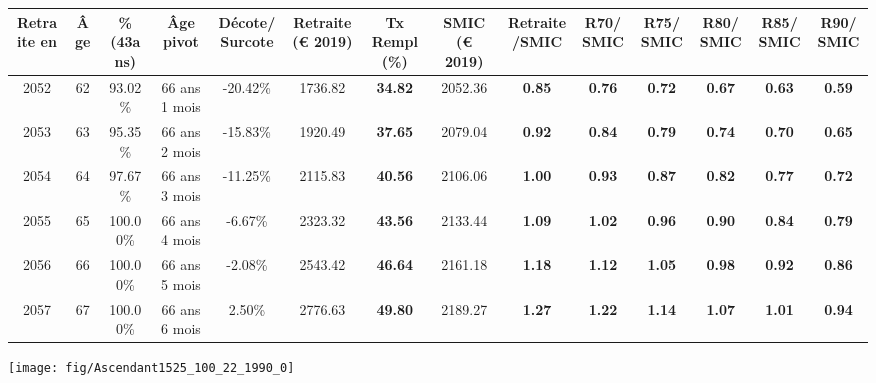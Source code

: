 \begin{adjustbox}{max width=\textwidth} 
\begin{tabular}[htb]{|c|c||c|c|c||c|c||c|c||c|c|c|c|c|} 
\hline 
 Retraite en &  Âge &  \%(43ans) &  Âge pivot &  Décote/Surcote &  Retraite (\euro{} 2019) &  Tx Rempl(\%) &  SMIC (\euro{} 2019) &  Retraite/SMIC &  R70/SMIC &  R75/SMIC &  R80/SMIC &  R85/SMIC &  R90/SMIC \\ 
\hline \hline 
 2052 &  62 &  93.02\% &  66 ans 1 mois &  -20.42\% &  1736.82 &  {\bf 34.82} &  2052.36 &  {\bf {\color{red} 0.85}} &  {\bf {\color{red} 0.76}} &  {\bf {\color{red} 0.72}} &  {\bf {\color{red} 0.67}} &  {\bf {\color{red} 0.63}} &  {\bf {\color{red} 0.59}} \\ 
\hline 
 2053 &  63 &  95.35\% &  66 ans 2 mois &  -15.83\% &  1920.49 &  {\bf 37.65} &  2079.04 &  {\bf {\color{red} 0.92}} &  {\bf {\color{red} 0.84}} &  {\bf {\color{red} 0.79}} &  {\bf {\color{red} 0.74}} &  {\bf {\color{red} 0.70}} &  {\bf {\color{red} 0.65}} \\ 
\hline 
 2054 &  64 &  97.67\% &  66 ans 3 mois &  -11.25\% &  2115.83 &  {\bf 40.56} &  2106.06 &  {\bf 1.00} &  {\bf {\color{red} 0.93}} &  {\bf {\color{red} 0.87}} &  {\bf {\color{red} 0.82}} &  {\bf {\color{red} 0.77}} &  {\bf {\color{red} 0.72}} \\ 
\hline 
 2055 &  65 &  100.00\% &  66 ans 4 mois &  -6.67\% &  2323.32 &  {\bf 43.56} &  2133.44 &  {\bf 1.09} &  {\bf 1.02} &  {\bf {\color{red} 0.96}} &  {\bf {\color{red} 0.90}} &  {\bf {\color{red} 0.84}} &  {\bf {\color{red} 0.79}} \\ 
\hline 
 2056 &  66 &  100.00\% &  66 ans 5 mois &  -2.08\% &  2543.42 &  {\bf 46.64} &  2161.18 &  {\bf 1.18} &  {\bf 1.12} &  {\bf 1.05} &  {\bf {\color{red} 0.98}} &  {\bf {\color{red} 0.92}} &  {\bf {\color{red} 0.86}} \\ 
\hline 
 2057 &  67 &  100.00\% &  66 ans 6 mois &  2.50\% &  2776.63 &  {\bf 49.80} &  2189.27 &  {\bf 1.27} &  {\bf 1.22} &  {\bf 1.14} &  {\bf 1.07} &  {\bf 1.01} &  {\bf {\color{red} 0.94}} \\ 
\hline 
\hline 
\end{tabular} 
\end{adjustbox} 
 
 \vspace{0.1cm} 

 {\hspace{-2.2cm}\texttt{[image: fig/Ascendant1525\_100\_22\_1990\_0]}} 

\newpage 
 
